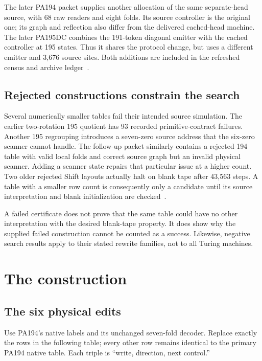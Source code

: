 \documentclass[11pt]{article}
\begin{document}
The later PA194 packet supplies another allocation of the same
separate-head source, with 68 raw readers and eight folds. Its source
controller is the original one; its graph and reflection also differ
from the delivered cached-head machine. The later PA195DC combines the
191-token diagonal emitter with the cached controller at 195 states.
Thus it shares the protocol change, but uses a different emitter and
3,676 source sites. Both additions are included in the refreshed census
and archive ledger~\cite{pa194b,pa195dc}.



\subsection{Rejected constructions constrain the search}

Several numerically smaller tables fail their intended source
simulation. The earlier two-rotation 195 quotient has 93 recorded
primitive-contract failures. Another 195 regrouping introduces a
seven-zero source address that the six-zero scanner cannot handle.
The follow-up packet similarly contains a rejected 194 table with valid
local folds and correct source graph but an invalid physical scanner.
Adding a scanner state repairs that particular issue at a higher count.
Two older rejected Shift layouts actually halt on blank tape after
43,563 steps. A table with a smaller row count is consequently only a
candidate until its source interpretation and blank initialization are
checked~\cite{pa194,followup}.

A failed certificate does not prove that the same table could have no
other interpretation with the desired blank-tape property. It does show
why the supplied failed construction cannot be counted as a success.
Likewise, negative search results apply to their stated rewrite families,
not to all Turing machines.

\section{The construction}

\subsection{The six physical edits}

Use PA194's native labels and its unchanged seven-fold decoder. Replace
exactly the rows in the following table; every other row remains
identical to the primary PA194 native table. Each triple is
``write, direction, next control.''
\end{document}
